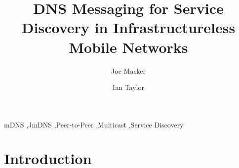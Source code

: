 \documentclass[preprint,12pt]{elsarticle}
\begin{document}
\begin{frontmatter}



\title{DNS Messaging for Service Discovery in Infrastructureless Mobile Networks}


\author[nrl]{Joe Macker}

\author[cu]{Ian Taylor}

\address[nrl]{Naval Research Lab, Washington DC, USA}
\address[cu]{School of Computer Science, Cardiff University, Cardiff, UK}

\begin{abstract}

\end{abstract}

\begin{keyword} mDNS \sep JmDNS \sep Peer-to-Peer \sep Multicast \sep Service Discovery \end{keyword}



\end{frontmatter}

\section{Introduction} 
\label{sec:introduction} 

\end{document}
